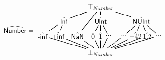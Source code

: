 \[
\abs{Number} = 
\begin{matrix} 
  \begin{tikzpicture}
    \node (top) at (0,0) {$\top_{Number}$};
    \node (upperleft) at (-1.9,-0.7) {$\hat{\SF{Inf}}$};
    \node (uppercenter) at (0,-0.7) {$\hat{\SF{UInt}}$};
    \node (upperright) at (2.1,-0.7) {$\hat{\SF{NUInt}}$};
    \node (lower1) at (-3.0,-1.5) {$\hat{\SF{-inf}}$};
    \node (lower2) at (-2.2,-1.5) {$\hat{\SF{+inf}}$};
    \node (lower3) at (-1.2,-1.5) {$\hat{\SF{NaN}}$};
    \node (lower4) at (-0.4,-1.5) {$\hat{0}$};
    \node (lower5) at (0,-1.5) {$\hat{1}$};
    \node (lower6) at (0.4,-1.5) {...};
    \node (lower7) at (1.2,-1.5) {...};
    \node (lower8) at (1.8,-1.5) {$\hat{-42}$};
    \node (lower9) at (2.4,-1.5) {$\hat{1.2}$};
    \node (lower10) at (3,-1.5) {...};
    \node (down) at (0,-2.4) {$\bot_{Number}$};
    \draw [black, thick, shorten <= -1pt, shorten >=-1pt] (top) -- (upperleft);
    \draw [black, thick, shorten <= -1pt, shorten >=-1pt] (top) -- (uppercenter);
    \draw [black, thick, shorten <= -1pt, shorten >=-1pt] (top) -- (upperright);
    \draw [black, thick, shorten <= -1pt, shorten >=-1pt] (top) -- (lower3);
    \draw [black, thick, shorten <= -1pt, shorten >=-1pt] (upperleft) -- (lower1);
    \draw [black, thick, shorten <= -1pt, shorten >=-1pt] (upperleft) -- (lower2);
    \draw [black, thick, shorten <= -1pt, shorten >=-1pt] (uppercenter) -- (lower4);
    \draw [black, thick, shorten <= -1pt, shorten >=-1pt] (uppercenter) -- (lower5);
    \draw [black, thick, shorten <= -1pt, shorten >=-1pt] (uppercenter) -- (lower6);
    \draw [black, thick, shorten <= -1pt, shorten >=-1pt] (upperright) -- (lower7);
    \draw [black, thick, shorten <= -1pt, shorten >=-1pt] (upperright) -- (lower8);
    \draw [black, thick, shorten <= -1pt, shorten >=-1pt] (upperright) -- (lower9);
    \draw [black, thick, shorten <= -1pt, shorten >=-1pt] (upperright) -- (lower10);
    \draw [black, thick, shorten <= -1pt, shorten >=-1pt] (lower1) -- (down);
    \draw [black, thick, shorten <= -1pt, shorten >=-1pt] (lower2) -- (down);
    \draw [black, thick, shorten <= -1pt, shorten >=-1pt] (lower3) -- (down);
    \draw [black, thick, shorten <= -1pt, shorten >=-1pt] (lower4) -- (down);
    \draw [black, thick, shorten <= -1pt, shorten >=-1pt] (lower5) -- (down);
    \draw [black, thick, shorten <= -1pt, shorten >=-1pt] (lower6) -- (down);
    \draw [black, thick, shorten <= -1pt, shorten >=-1pt] (lower7) -- (down);
    \draw [black, thick, shorten <= -1pt, shorten >=-1pt] (lower8) -- (down);
    \draw [black, thick, shorten <= -1pt, shorten >=-1pt] (lower9) -- (down);
    \draw [black, thick, shorten <= -1pt, shorten >=-1pt] (lower10) -- (down);
  \end{tikzpicture}
\end{matrix}
\]
